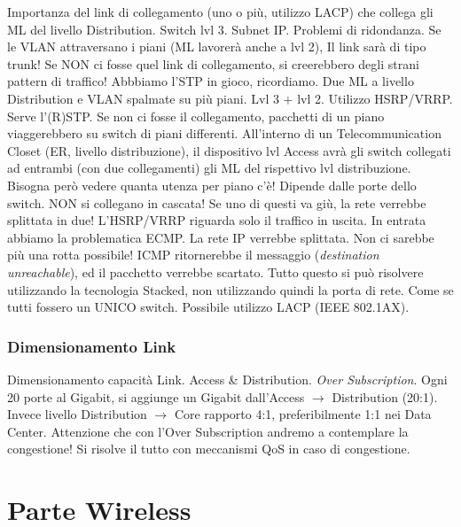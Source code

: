 Importanza del link di collegamento (uno o più, utilizzo LACP) che collega gli ML del livello Distribution. Switch lvl 3. Subnet IP. Problemi di ridondanza. Se le VLAN attraversano i piani (ML lavorerà anche a lvl 2), Il link sarà di tipo trunk! Se NON ci fosse quel link di collegamento, si creerebbero degli strani pattern di traffico! Abbbiamo l'STP in gioco, ricordiamo. Due ML a livello Distribution e VLAN spalmate su più piani. Lvl 3 + lvl 2. Utilizzo HSRP/VRRP. Serve l'(R)STP. Se non ci fosse il collegamento, pacchetti di un piano viaggerebbero su switch di piani differenti. All'interno di un Telecommunication Closet (ER, livello distribuzione), il dispositivo lvl Access avrà gli switch collegati ad entrambi (con due collegamenti) gli ML del rispettivo lvl distribuzione. Bisogna però vedere quanta utenza per piano c'è! Dipende dalle porte dello switch. NON si collegano in cascata! Se uno di questi va giù, la rete verrebbe splittata in due! L'HSRP/VRRP riguarda solo il traffico in uscita. In entrata abbiamo la problematica ECMP. La rete IP verrebbe splittata. Non ci sarebbe più una rotta possibile! ICMP ritornerebbe il messaggio (\textit{destination unreachable}), ed il pacchetto verrebbe scartato. Tutto questo si può risolvere utilizzando la tecnologia Stacked, non utilizzando quindi la porta di rete. Come se tutti fossero un UNICO switch. Possibile utilizzo LACP (IEEE 802.1AX).

\subsubsection{Dimensionamento Link} 

Dimensionamento capacità Link. Access \& Distribution. \textit{Over Subscription}. Ogni 20 porte al Gigabit, si aggiunge un Gigabit dall'Access $\rightarrow$ Distribution (20:1). Invece livello Distribution $\rightarrow$ Core rapporto 4:1, preferibilmente 1:1 nei Data Center. Attenzione che con l'Over Subscription andremo a contemplare la congestione! Si risolve il tutto con meccanismi QoS in caso di congestione.


\section{Parte Wireless}

